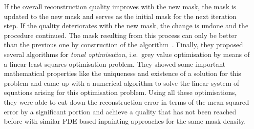 If the overall reconstruction quality improves with the new mask, the mask is updated to the new
mask and serves as the initial mask for the next iteration step. If the quality deteriorates with
the new mask, the change is undone and the procedure continued.
The mask resulting from this process can only be better than the previous one by construction of
the algorithm~\cite{hoeltgen12}.
Finally, they proposed several algorithms for \textit{tonal optimisation}, i.e.\ grey value
optimisation by means of a linear least squares optimisation problem. They showed some important
mathematical properties like the uniqueness and existence of a solution for this problem and
came up with a numerical algorithm to solve the linear system of equations arising for this
optimisation problem.
Using all these optimisations, they were able to cut down the reconstruction error in terms of the
mean squared error by a significant portion and achieve a quality that has not been reached before 
with similar PDE based inpainting approaches for the same mask density.

